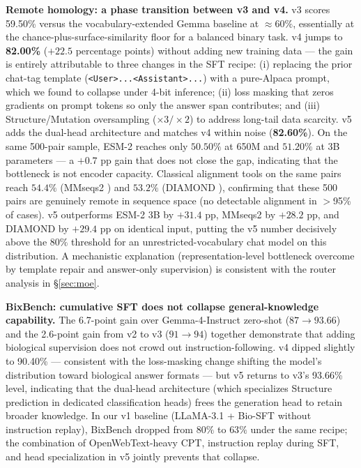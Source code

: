 \documentclass[11pt]{article}
\begin{document}
\textbf{Remote homology: a phase transition between v3 and v4.} v3 scores 59.50\% versus the vocabulary-extended Gemma baseline at $\approx 60\%$, essentially at the chance-plus-surface-similarity floor for a balanced binary task. v4 jumps to \textbf{82.00\%} ($+22.5$ percentage points) without adding new training data --- the gain is entirely attributable to three changes in the SFT recipe: (i) replacing the prior chat-tag template (\texttt{<User>...<Assistant>...}) with a pure-Alpaca prompt, which we found to collapse under 4-bit inference; (ii) loss masking that zeros gradients on prompt tokens so only the answer span contributes; and (iii) Structure/Mutation oversampling ($\times 3 / \times 2$) to address long-tail data scarcity. v5 adds the dual-head architecture and matches v4 within noise (\textbf{82.60\%}). On the same 500-pair sample, ESM-2 \citep{lin2023evolutionary} reaches only $50.50\%$ at 650M and $51.20\%$ at 3B parameters --- a $+0.7$ pp gain that does not close the gap, indicating that the bottleneck is not encoder capacity. Classical alignment tools on the same pairs reach $54.4\%$ (MMseqs2 \citep{steinegger2017mmseqs2}) and $53.2\%$ (DIAMOND \citep{buchfink2021diamond}), confirming that these 500 pairs are genuinely remote in sequence space (no detectable alignment in $>$95\% of cases). v5 outperforms ESM-2 3B by $+31.4$ pp, MMseqs2 by $+28.2$ pp, and DIAMOND by $+29.4$ pp on identical input, putting the v5 number decisively above the $80\%$ threshold for an unrestricted-vocabulary chat model on this distribution. A mechanistic explanation (representation-level bottleneck overcome by template repair and answer-only supervision) is consistent with the router analysis in \S\ref{sec:moe}.

\textbf{BixBench: cumulative SFT does not collapse general-knowledge capability.} The 6.7-point gain over Gemma-4-Instruct zero-shot ($87 \to 93.66$) and the 2.6-point gain from v2 to v3 ($91 \to 94$) together demonstrate that adding biological supervision does not crowd out instruction-following. v4 dipped slightly to 90.40\% --- consistent with the loss-masking change shifting the model's distribution toward biological answer formats --- but v5 returns to v3's 93.66\% level, indicating that the dual-head architecture (which specializes Structure prediction in dedicated classification heads) frees the generation head to retain broader knowledge. In our v1 baseline (LLaMA-3.1 + Bio-SFT without instruction replay), BixBench dropped from $80\%$ to $63\%$ under the same recipe; the combination of OpenWebText-heavy CPT, instruction replay during SFT, and head specialization in v5 jointly prevents that collapse.
\end{document}
